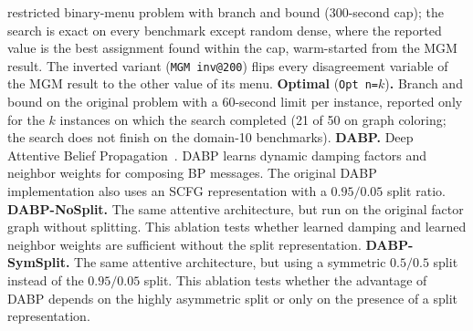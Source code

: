 restricted binary-menu problem with branch and bound (300-second cap); the
search is exact on every benchmark except random dense, where the reported
value is the best assignment found within the cap, warm-started from the
MGM result.  The inverted variant (\texttt{MGM inv@200}) flips every
disagreement variable of the MGM result to the other value of its menu.
\textbf{Optimal} (\texttt{Opt n=$k$})\textbf{.}  Branch and bound on the
original problem with a 60-second limit per instance, reported only for the $k$
instances on which the search completed (21 of 50 on graph coloring; the search
does not finish on the domain-10 benchmarks).
\textbf{DABP.}  Deep Attentive Belief Propagation~\cite{DengKL022}.  DABP
learns dynamic damping factors and neighbor weights for composing BP messages.
The original DABP implementation also uses an SCFG representation with a
$0.95/0.05$ split ratio.
\textbf{DABP-NoSplit.}  The same attentive architecture, but run on the original
factor graph without splitting.  This ablation tests whether learned damping
and learned neighbor weights are sufficient without the split representation.
\textbf{DABP-SymSplit.}  The same attentive architecture, but using a symmetric
$0.5/0.5$ split instead of the $0.95/0.05$ split.  This ablation tests whether
the advantage of DABP depends on the highly asymmetric split or only on the
presence of a split representation.
